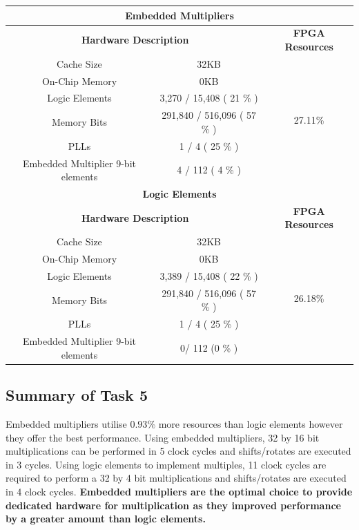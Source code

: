 \documentclass{article}
\begin{document}
\begin{table}[H]
  \centering
    \begin{tabular}{|c|c|c|}
    \hline
    \multicolumn{3}{|c|}{\textbf{Embedded Multipliers}} \\
    \hline
    \multicolumn{2}{|c|}{\textbf{Hardware Description}} & \textbf{FPGA Resources} \\
    \hline
    Cache Size & 32KB  & \multirow{6}{*}{27.11\%} \\
\cline{1-2}    On-Chip Memory & 0KB   &  \\
\cline{1-2}    Logic Elements & 3,270 / 15,408 ( 21 \% ) &  \\
\cline{1-2}    Memory Bits & 291,840 / 516,096 ( 57 \% ) &  \\
\cline{1-2}    PLLs  & 1 / 4 ( 25 \% ) &  \\
\cline{1-2}    Embedded Multiplier 9-bit elements & 4 / 112 ( 4 \% ) &  \\
    \hline
    \multicolumn{3}{|c|}{\textbf{Logic Elements}} \\
    \hline
    \multicolumn{2}{|c|}{\textbf{Hardware Description}} & \textbf{FPGA Resources} \\
    \hline
    Cache Size & 32KB  & \multirow{6}{*}{26.18\%} \\
\cline{1-2}    On-Chip Memory & 0KB   &  \\
\cline{1-2}    Logic Elements & 3,389 / 15,408 ( 22 \% ) &  \\
\cline{1-2}    Memory Bits & 291,840 / 516,096 ( 57 \% ) &  \\
\cline{1-2}    PLLs  & 1 / 4 ( 25 \% ) &  \\
\cline{1-2}    Embedded Multiplier 9-bit elements & 0/ 112 (0 \% ) &  \\
    \hline
    \end{tabular}%
\textbf{}
  \label{tab:task5_resources}%
\end{table}%

\subsection{Summary of Task 5}
Embedded multipliers utilise $0.93\%$ more resources than logic elements however they offer the best performance. Using embedded multipliers, 32 by 16 bit multiplications can be performed in 5 clock cycles and shifts/rotates are executed in 3 cycles.  Using logic elements to implement multiples, 11 clock cycles are required to perform a 32 by 4 bit multiplications and shifts/rotates are executed in 4 clock cycles\cite{multiplier}. \textbf{Embedded multipliers are the optimal choice to provide dedicated hardware for multiplication as they improved performance by a greater amount than logic elements.}
\end{document}
